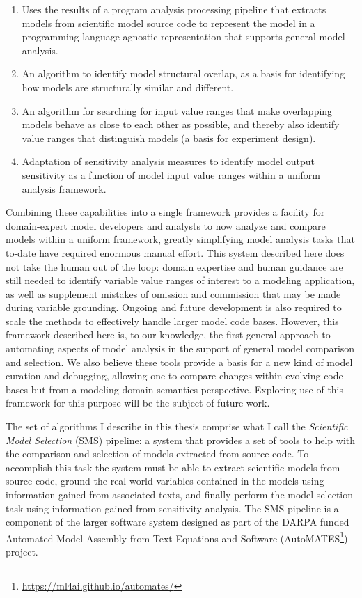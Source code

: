 \begin{enumerate}
  \item Uses the results of a program analysis processing pipeline that extracts models from scientific model source code to represent the model in a programming language-agnostic representation that supports general model analysis.
  \item An algorithm to identify model structural overlap, as a basis for identifying how models are structurally similar and different.
  \item An algorithm for searching for input value ranges that make overlapping models behave as close to each other as possible, and thereby also identify value ranges that distinguish models (a basis for experiment design).
  \item Adaptation of sensitivity analysis measures to identify model output sensitivity as a function of model input value ranges within a uniform analysis framework.
\end{enumerate}

Combining these capabilities into a single framework provides a facility for domain-expert model developers and analysts to now analyze and compare models within a uniform framework, greatly simplifying model analysis tasks that to-date have required enormous manual effort.
This system described here does not take the human out of the loop: domain expertise and human guidance are still needed to identify variable value ranges of interest to a modeling application, as well as supplement mistakes of omission and commission that may be made during variable grounding.
Ongoing and future development is also required to scale the methods to effectively handle larger model code bases.
However, this framework described here is, to our knowledge, the first general approach to automating aspects of model analysis in the support of general model comparison and selection.
We also believe these tools provide a basis for a new kind of model curation and debugging, allowing one to compare changes within evolving code bases but from a modeling domain-semantics perspective. Exploring use of this framework for this purpose will be the subject of future work.

The set of algorithms I describe in this thesis comprise what I call the \emph{Scientific Model Selection} (SMS) pipeline: a system that provides a set of tools to help with the comparison and selection of models extracted from source code.
To accomplish this task the system must be able to extract scientific models from source code, ground the real-world variables contained in the models using information gained from associated texts, and finally perform the model selection task using information gained from sensitivity analysis.
The SMS pipeline is a component of the larger software system designed as part of the DARPA funded Automated Model Assembly from Text Equations and Software \citep{pyarelal2019} (AutoMATES\footnote{\url{https://ml4ai.github.io/automates/}}) project.

